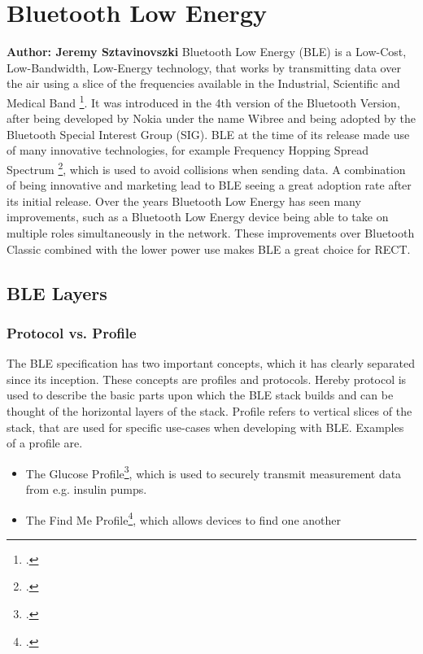 \section{Bluetooth Low Energy}
\textbf{Author: Jeremy Sztavinovszki}
\newline
Bluetooth Low Energy (BLE) is a Low-Cost, Low-Bandwidth, Low-Energy technology, that works by transmitting data over the air using a slice of the frequencies available in the Industrial, Scientific and Medical Band \footcite{ism}.
It was introduced in the 4th version of the Bluetooth Version, after being developed by Nokia under the name Wibree and being adopted by the Bluetooth Special Interest Group (SIG). BLE at the time of its release made use of many
innovative technologies, for example Frequency Hopping Spread Spectrum \footcite{fhss}, which is used to avoid collisions when sending data. A combination of being innovative and marketing lead to BLE seeing a great adoption rate
after its initial release. Over the years Bluetooth Low Energy has seen many improvements, such as a Bluetooth Low Energy device being able to take on multiple roles simultaneously in the network. These improvements over Bluetooth Classic
combined with the lower power use makes BLE a great choice for RECT.

\subsection{BLE Layers}
\subsubsection{Protocol vs. Profile}
The BLE specification has two important concepts, which it has clearly separated since its inception. These concepts are profiles and protocols. Hereby protocol is used to describe
the basic parts upon which the BLE stack builds and can be thought of the horizontal layers of the stack. Profile refers to vertical slices of the stack, that are used for specific use-cases when developing with BLE. Examples of a profile are.

\begin{itemize}
	\item The Glucose Profile\footcite{glucose-profile}, which is used to securely transmit measurement data from e.g. insulin pumps. 
	\item The Find Me Profile\footcite{find-me-profile}, which allows devices to find one another
\end{itemize}

